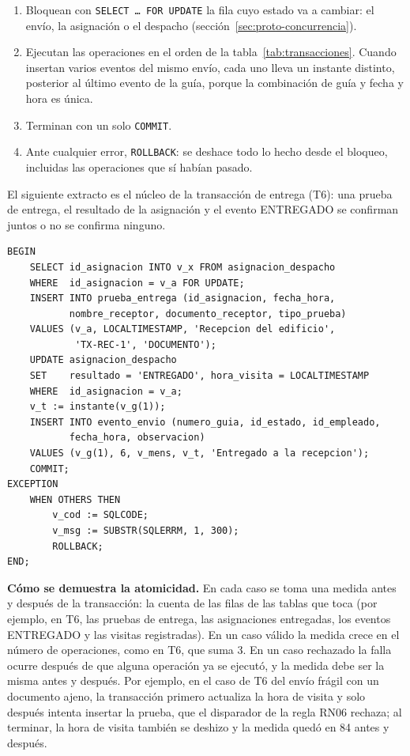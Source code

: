 \begin{enumerate}[itemsep=2pt]
  \item Bloquean con \texttt{SELECT \ldots{} FOR UPDATE} la fila cuyo
        estado va a cambiar: el envío, la asignación o el despacho
        (sección~\ref{sec:proto-concurrencia}).
  \item Ejecutan las operaciones en el orden de la
        tabla~\ref{tab:transacciones}. Cuando insertan varios eventos del
        mismo envío, cada uno lleva un instante distinto, posterior al
        último evento de la guía, porque la combinación de guía y
        fecha y hora es única.
  \item Terminan con un solo \texttt{COMMIT}.
  \item Ante cualquier error, \texttt{ROLLBACK}: se deshace todo lo hecho
        desde el bloqueo, incluidas las operaciones que sí habían pasado.
\end{enumerate}

El siguiente extracto es el núcleo de la transacción de entrega (T6): una
prueba de entrega, el resultado de la asignación y el evento ENTREGADO
se confirman juntos o no se confirma ninguno.

\begin{lstlisting}[style=sqlpro]
BEGIN
    SELECT id_asignacion INTO v_x FROM asignacion_despacho
    WHERE  id_asignacion = v_a FOR UPDATE;
    INSERT INTO prueba_entrega (id_asignacion, fecha_hora,
           nombre_receptor, documento_receptor, tipo_prueba)
    VALUES (v_a, LOCALTIMESTAMP, 'Recepcion del edificio',
            'TX-REC-1', 'DOCUMENTO');
    UPDATE asignacion_despacho
    SET    resultado = 'ENTREGADO', hora_visita = LOCALTIMESTAMP
    WHERE  id_asignacion = v_a;
    v_t := instante(v_g(1));
    INSERT INTO evento_envio (numero_guia, id_estado, id_empleado,
           fecha_hora, observacion)
    VALUES (v_g(1), 6, v_mens, v_t, 'Entregado a la recepcion');
    COMMIT;
EXCEPTION
    WHEN OTHERS THEN
        v_cod := SQLCODE;
        v_msg := SUBSTR(SQLERRM, 1, 300);
        ROLLBACK;
END;
\end{lstlisting}

\textbf{Cómo se demuestra la atomicidad.} En cada caso se toma una
medida antes y después de la transacción: la cuenta de las filas de las
tablas que toca (por ejemplo, en T6, las pruebas de entrega, las
asignaciones entregadas, los eventos ENTREGADO y las visitas
registradas). En un caso válido la medida crece en el número de
operaciones, como en T6, que suma 3. En un caso rechazado la falla ocurre
después de que alguna operación ya se ejecutó, y la medida debe ser la
misma antes y después. Por ejemplo, en el caso de T6 del envío frágil con
un documento ajeno, la transacción primero actualiza la hora de visita y
solo después intenta insertar la prueba, que el disparador de la
regla RN06 rechaza; al terminar, la hora de visita también se deshizo y la
medida quedó en 84 antes y después.

